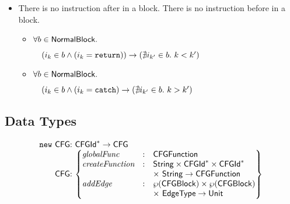 \begin{itemize}
\item There is no instruction after  in a block. There is no instruction before  in a block.
\begin{itemize}
\item $\forall b \in \mbox{\textsf{NormalBlock}}.$

$\quad(i_k \in b \wedge (i_k = \mbox{\texttt{return}})) \rightarrow (\nexists i_{k'} \in b.\ k < k')$
\item $\forall b \in \mbox{\textsf{NormalBlock}}.$

$\quad(i_k \in b \wedge (i_k = \mbox{\texttt{catch}}) \rightarrow (\nexists i_{k'} \in b.\ k > k')$
\end{itemize}
\end{itemize}

\subsection{\CFG Data Types}
\[
\begin{array}{@{~}r@{~}l@{}l@{~}l}
\new & \CFG & : & \CFGId^{*} \rightarrow \CFG \\
& \CFG & : &
\begin{Bmatrix*}[l]
\emph{globalFunc} & : & \SF{CFGFunction}\\
\emph{createFunction} & : & \String \times \CFGId^{*} \times \CFGId^{*} \\
&&\times\ \String \rightarrow \CFGFunction \\
\emph{addEdge} & : & \powerset{\CFGBlock} \times \powerset{\CFGBlock}\\
&& \times\ \EdgeType \rightarrow \Unit
\end{Bmatrix*}
\end{array}
\]

